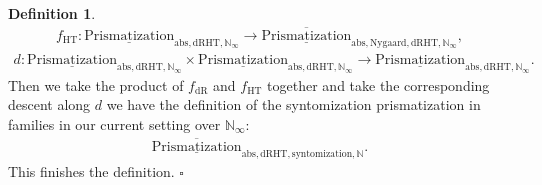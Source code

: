 \documentclass[12pt]{article}
\theoremstyle{definition}
\newtheorem{definition}{Definition}
\begin{document}
\begin{definition}
\begin{align}
f_\mathrm{HT}: {\underline{\mathrm{Prismatization}}}_{\mathrm{abs},\mathrm{dRHT},\mathbb{N}_\infty}\rightarrow \overline{\underline{\mathrm{Prismatization}}}_{\mathrm{abs},\mathrm{Nygaard},\mathrm{dRHT},\mathbb{N}_\infty},
\end{align}
\begin{align}
d:  {\underline{\mathrm{Prismatization}}}_{\mathrm{abs},\mathrm{dRHT},\mathbb{N}_\infty}\times {\underline{\mathrm{Prismatization}}}_{\mathrm{abs},\mathrm{dRHT},\mathbb{N}_\infty} \rightarrow {\underline{\mathrm{Prismatization}}}_{\mathrm{abs},\mathrm{dRHT},\mathbb{N}_\infty}.
\end{align}
Then we take the product of $f_\mathrm{dR}$ and $f_\mathrm{HT}$ together and take the corresponding descent along $d$ we have the definition of the syntomization prismatization in families in our current setting over $\mathbb{N}_\infty$:
\begin{align}
\overline{\underline{\mathrm{Prismatization}}}_{\mathrm{abs},\mathrm{dRHT},\mathrm{syntomization},\mathbb{N}}. 
\end{align}
This finishes the definition. $\square$
\end{definition}
\end{document}
